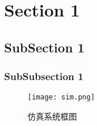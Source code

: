 \section{Section 1}
\subsection{SubSection 1}
\subsubsection{SubSubsection 1}
\begin{figure}[!h]
\centering\texttt{[image: sim.png]}
\caption{仿真系统框图}
\label{sim}
\end{figure}

\endinput
